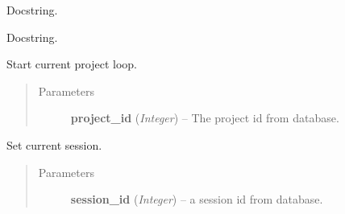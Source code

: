 \documentclass[letterpaper,10pt,english]{sphinxmanual}
\begin{document}
\begin{fulllineitems}
\begin{fulllineitems}
\begin{quote}
\begin{description}
\end{description}\end{quote}

\end{fulllineitems}


\begin{fulllineitems}
\label{state:state.State.on_project_selected}
Docstring.

\end{fulllineitems}


\begin{fulllineitems}
\label{state:state.State.remove_observers}
Docstring.

\end{fulllineitems}


\begin{fulllineitems}
\label{state:state.State.set_current_project}
Start current project loop.
\begin{quote}\begin{description}
\item[{Parameters}] \leavevmode
\textbf{project\_id} (\emph{Integer}) -- The project id from database.

\end{description}\end{quote}

\end{fulllineitems}


\begin{fulllineitems}
\label{state:state.State.set_current_session}
Set current session.
\begin{quote}\begin{description}
\item[{Parameters}] \leavevmode
\textbf{session\_id} (\emph{Integer}) -- a session id from database.

\end{description}\end{quote}


\end{fulllineitems}
\end{fulllineitems}
\end{document}
